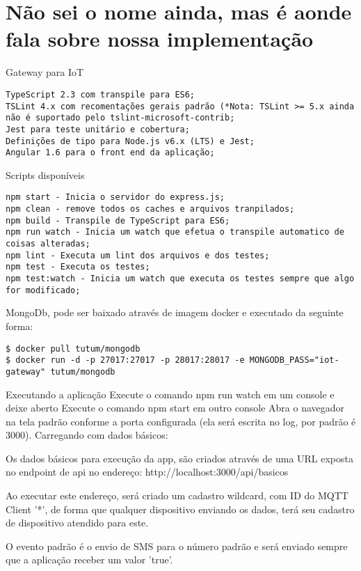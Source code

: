 \section{Não sei o nome ainda, mas é aonde fala sobre nossa implementação}
\label{sec:iotGateway}

Gateway para IoT
\begin{verbatim}
TypeScript 2.3 com transpile para ES6;
TSLint 4.x com recomentações gerais padrão (*Nota: TSLint >= 5.x ainda não é suportado pelo tslint-microsoft-contrib;
Jest para teste unitário e cobertura;
Definições de tipo para Node.js v6.x (LTS) e Jest;
Angular 1.6 para o front end da aplicação;
\end{verbatim}

Scripts disponíveis
\begin{verbatim}
npm start - Inicia o servidor do express.js;
npm clean - remove todos os caches e arquivos tranpilados;
npm build - Transpile de TypeScript para ES6;
npm run watch - Inicia um watch que efetua o transpile automatico de coisas alteradas;
npm lint - Executa um lint dos arquivos e dos testes;
npm test - Executa os testes;
npm test:watch - Inicia um watch que executa os testes sempre que algo for modificado;
\end{verbatim}

MongoDb, pode ser baixado através de imagem docker e executado da seguinte forma:
\begin{verbatim}
$ docker pull tutum/mongodb
$ docker run -d -p 27017:27017 -p 28017:28017 -e MONGODB_PASS="iot-gateway" tutum/mongodb
\end{verbatim}

Executando a aplicação
Execute o comando npm run watch em um console e deixe aberto
Execute o comando npm start em outro console
Abra o navegador na tela padrão conforme a porta configurada (ela será escrita no log, por padrão é 3000).
Carregando com dados básicos:

Os dados básicos para execução da app, são criados através de uma URL exposta no endpoint de api no endereço: http://localhost:3000/api/basicos

Ao executar este endereço, será criado um cadastro wildcard, com ID do MQTT Client '*', de forma que qualquer dispositivo enviando os dados, terá seu cadastro de dispositivo atendido para este.

O evento padrão é o envio de SMS para o número padrão e será enviado sempre que a aplicação receber um valor 'true'.